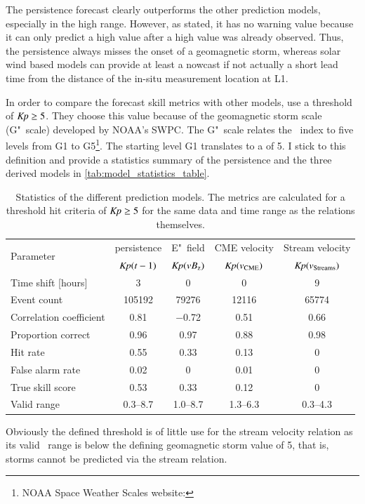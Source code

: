 The persistence forecast clearly outperforms the other prediction models, especially in the high \Kp{} range. However, as \citet{Detman1999} stated, it has no warning value because it can only predict a high \Kp{} value after a high \Kp{} value was already observed. Thus, the persistence always misses the onset of a geomagnetic storm, whereas solar wind based models can provide at least a nowcast if not actually a short lead time from the distance of the in-situ measurement location at L1.

In order to compare the \Kp{} forecast skill metrics with other models, \citet{Savani2017} use a threshold of $\textit{Kp}{} \geq 5$. They choose this value because of the geomagnetic storm scale (G"~scale) developed by NOAA's SWPC. The G"~scale relates the \Kp~index to five levels from G1 to G5\footnote{NOAA Space Weather Scales website: }. The starting level G1 translates to a \Kp{} of 5. I stick to this definition and provide a statistics summary of the \Kp{} persistence and the three derived models in \autoref{tab:model_statistics_table}.
\begin{table}[htb]
	\caption{Statistics of the different prediction models. The metrics are calculated for a threshold hit criteria of $\textit{Kp}{} \geq 5$ for the same data and time range as the relations themselves.}
	\label{tab:model_statistics_table}
	\centering
	\begin{tabular}{lcccc}
		\hline\hline
		\multirow{2}{*}{Parameter}	&\Kp{} persistence	&E"~field	&CME velocity 	&Stream velocity\\
			&$\textit{Kp}(t-1)$	&$\textit{Kp}(\text{$vB_\text{z}$})$	&$\textit{Kp}(v_\text{CME})$	&$\textit{Kp}(v_\text{Streams})$\\
		\hline
		Time shift [hours]	&3	&0	&0	&9\\
		Event count	&\num{105192}	&\num{79276}	&\num{12116}	&\num{65774}\\
		Correlation coefficient	&0.81	&\num{-0.72}	&0.51	&0.66\\
		\hline
		Proportion correct	&0.96	&0.97	&0.88	&0.98\\
		Hit rate	&0.55	&0.33	&0.13	&0\\
		False alarm rate	&0.02	&0	&0.01	&0\\
		True skill score	&0.53	&0.33	&0.12	&0\\
		Valid \Kp{} range	&\numrange{0.3}{8.7}	&\numrange{1.0}{8.7}	&\numrange{1.3}{6.3}	&\numrange{0.3}{4.3}\\
		\hline
	\end{tabular}
\end{table}
Obviously the defined \Kp{} threshold is of little use for the stream velocity relation as its valid \Kp~range is below the defining geomagnetic storm value of \Kp{} 5, that is, storms cannot be predicted via the stream relation.

